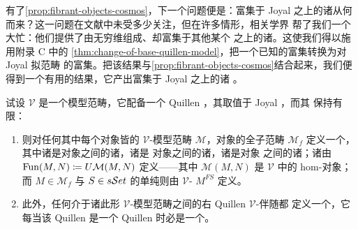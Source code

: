 有了\cref{prop:fibrant-objects-cosmos}，下一个问题便是：富集于 Joyal \trModelStructure{}%
之上的诸\trModelCategory{}从何而来？这一问题在文献中未受多少关注，但在许多情形，相关学界
帮了我们一个大忙：他们提供了由无穷维\trCategory{}组成、却富集于其他某个\trCartesianClosed
\trModelCategory{}之上的诸\trModelCategory。这使我们得以施用附录 C 中的%
\cref{thm:change-of-base-quillen-model}，把一个已知的富集转换为对 Joyal 拟范畴%
\trModelStructure{}的富集。把该结果与\cref{prop:fibrant-objects-cosmos}结合起来，我们便
得到一个有用的\trChangeOfBase{}结果，它产出富集于 Joyal \trModelStructure{}之上的诸%
\trModelCategory。

\begin{proposition}\label{prop:change-of-base-model-cosmoi}
试设 $\mathcal{V}$ 是一个\trCartesianClosed{}模型范畴，它配备一个 Quillen
\trAdjunction，其\trRightAdjoint{}取值于 Joyal \trModelStructure{}，而其\trLeftAdjoint{}%
保持有限\trProduct{}：
\begin{center}
\end{center}
\begin{enumerate}[label=(\roman*)]
\item 则对任何其中每个\trFibrant{}对象皆\trCofibrant{}的 $\mathcal{V}$-模型范畴
  $\mathcal{M}$，\trFibrant{}对象的全子范畴 $\mathcal{M}_{f}$ 定义一个\trInfinityCosmos，
  其中诸\trIsofibration{}是\trFibrant{}对象之间的诸\trFibration，诸\trEquivalence{}是%
  \trFibrant{}对象之间的诸\trWeakEquivalence，诸\trTrivialFibration{}是\trFibrant{}对象
  之间的诸\trTrivialFibration；诸\trFunctorSpace{}由
  $\operatorname{Fun}(M,N)\coloneqq U\mathcal{M}(M,N)$ 定义——其中 $\mathcal{M}(M,N)$ 是 $\mathcal{V}$
  中的 hom-对象；而 $M\in\mathcal{M}_{f}$ 与 $S\in s\mathcal{S}et$ 的单纯\trCotensor{}则由
  $\mathcal{V}$-\trCotensor{} $M^{FS}$ 定义。
\item 此外，任何介于诸此形 $\mathcal{V}$-模型范畴之间的右 Quillen $\mathcal{V}$-伴随都
  定义一个\trCosmologicalFunctor，它每当该 Quillen \trAdjunction{}是一个 Quillen
  \trEquivalence{}时必是一个\trCosmologicalBiequivalence。
\end{enumerate}
\end{proposition}
